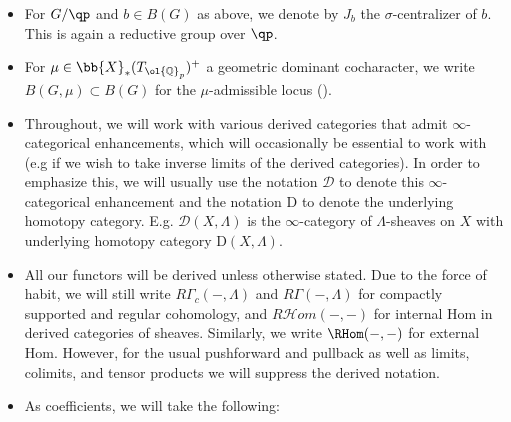 \documentclass[letterpaper,11pt]{amsart}
\begin{document}
\begin{itemize}
Moreover, the product map $\nu \times \kappa$ is injective. We can endow $B(G)$ with a partial ordering where $b \geq b'$ if $\nu_{b} - \nu_{b'}$ (in this order!) is a $\bb{Q}_{\geq 0}$-linear combination of positive coroots and $\kappa(b) = \kappa(b')$. 
\item For $G/\qp$ and $b\in B(G)$ as above, we denote by $J_b$ the $\sigma$-centralizer of $b$. This is again a reductive group over $\qp$.
\item For $\mu \in \bb{X}_{*}(T_{\ol{\mathbb{Q}}_{p}})^{+}$ a geometric dominant cocharacter, we write $B(G,\mu) \subset B(G)$ for the $\mu$-admissible locus (\cite[Definition~2.3]{RV}).
\item Throughout, we will work with various derived categories that admit $\infty$-categorical enhancements, which will occasionally be essential to work with (e.g if we wish to take inverse limits of the derived categories). In order to emphasize this, we will usually use the notation $\mathcal{D}$ to denote this $\infty$-categorical enhancement and the notation $\mathrm{D}$ to denote the underlying homotopy category. E.g. $\mathcal{D}(X,\Lambda)$ is the $\infty$-category of $\Lambda$-sheaves on $X$ with underlying homotopy category $\mathrm{D}(X,\Lambda)$.
\item All our functors will be derived unless otherwise stated. Due to the force of habit, we will still write $R\Gamma_{c}(-,\Lambda)$ and $R\Gamma(-,\Lambda)$ for compactly supported and regular cohomology, and $R\mathcal{H}om(-,-)$ for internal Hom in derived categories of sheaves. Similarly, we write $\RHom(-,-)$ for external Hom. However, for the usual pushforward and pullback as well as limits, colimits, and tensor products we will suppress the derived notation.

\item As coefficients, we will take the following: 


\end{itemize}
\end{document}
